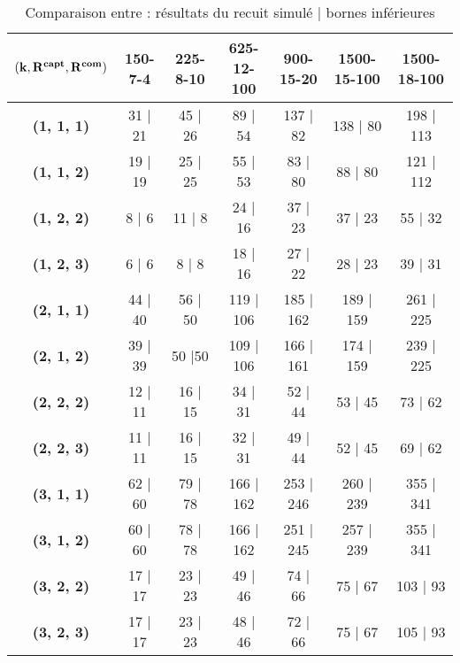 \documentclass[12pt]{article}
\begin{document}
\begin{table}[H]
  \caption{Comparaison entre : résultats du recuit simulé | bornes inférieures}
  \centering
  \label{tab:my-table}
  \begin{tabular}{|c|c|c|c|c|c|c|}
  \hline
  $\bf{(k, R^{capt}, R^{com})}$ & \textbf{150-7-4} & \textbf{225-8-10} & \textbf{625-12-100} & \textbf{900-15-20} & \textbf{1500-15-100} & \textbf{1500-18-100} \\ \hline
  \textbf{(1, 1, 1)} & 31 | 21            & 45 | 26             & 89 | 54               & 137 | 82             & 138 | 80               & 198 | 113              \\ \hline
  \textbf{(1, 1, 2)} & 19 | 19            & 25 | 25             & 55 | 53               & 83 | 80              & 88 | 80                & 121 | 112              \\ \hline
  \textbf{(1, 2, 2)} & 8 | 6              & 11 | 8              & 24 | 16               & 37 | 23              & 37 | 23                & 55 | 32                \\ \hline
  \textbf{(1, 2, 3)} & 6 | 6              & 8 | 8               & 18 | 16               & 27 | 22              & 28 | 23                & 39 | 31                \\ \hline
  \textbf{(2, 1, 1)} & 44 | 40            & 56 | 50             & 119 | 106             & 185 | 162            & 189 | 159              & 261 | 225              \\ \hline
  \textbf{(2, 1, 2)} & 39 | 39            & 50 |50              & 109 | 106             & 166 | 161            & 174 | 159              & 239 | 225              \\ \hline
  \textbf{(2, 2, 2)} & 12 | 11            & 16 | 15             & 34 | 31               & 52 | 44              & 53 | 45                & 73 | 62                \\ \hline
  \textbf{(2, 2, 3)} & 11 | 11            & 16 | 15             & 32 | 31               & 49 | 44              & 52 | 45                & 69 | 62                \\ \hline
  \textbf{(3, 1, 1)} & 62 | 60            & 79 | 78             & 166 | 162             & 253 | 246            & 260 | 239              & 355 | 341              \\ \hline
  \textbf{(3, 1, 2)} & 60 | 60            & 78 | 78             & 166 | 162             & 251 | 245            & 257 | 239              & 355 | 341              \\ \hline
  \textbf{(3, 2, 2)} & 17 | 17            & 23 | 23             & 49 | 46               & 74 | 66              & 75 | 67                & 103 | 93               \\ \hline
  \textbf{(3, 2, 3)} & 17 | 17            & 23 | 23             & 48 | 46               & 72 | 66              & 75 | 67                & 105 | 93               \\ \hline
  \end{tabular}
\end{table}
\end{document}
